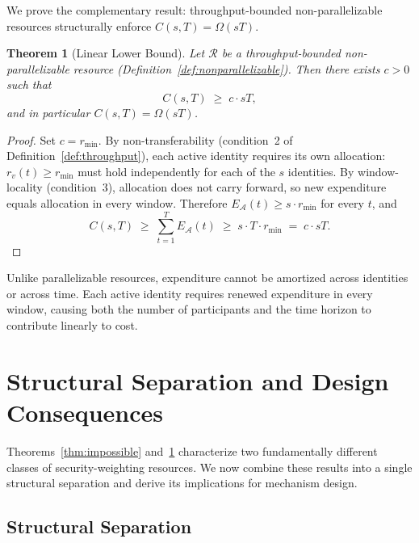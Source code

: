 \documentclass[manuscript,review]{acmart}
\newtheorem{theorem}{Theorem}[section]
\theoremstyle{remark}
\begin{document}
	We prove the complementary result: throughput-bounded
	non-parallelizable resources structurally enforce
	$C(s,T) = \Omega(sT)$.
	
	\begin{theorem}[Linear Lower Bound]
		\label{thm:linear}
		Let $\mathcal{R}$ be a throughput-bounded
		non-parallelizable resource
		(Definition~\ref{def:nonparallelizable}).
		Then there exists $c > 0$ such that
		\begin{equation}
			C(s, T) \;\geq\; c \cdot sT,
		\end{equation}
		and in particular $C(s,T) = \Omega(sT)$.
	\end{theorem}
	
	\begin{proof}
		Set $c = r_{\min}$.
		By non-transferability (condition~2 of
		Definition~\ref{def:throughput}), each active identity
		requires its own allocation: $r_v(t) \geq r_{\min}$
		must hold independently for each of the $s$ identities.
		By window-locality (condition~3), allocation does not
		carry forward, so new expenditure equals allocation
		in every window.
		Therefore $E_{\mathcal{A}}(t) \geq s \cdot r_{\min}$
		for every $t$, and
		\begin{equation}
			C(s, T) \;\geq\; \sum_{t=1}^{T} E_{\mathcal{A}}(t)
			\;\geq\; s \cdot T \cdot r_{\min}
			\;=\; c \cdot sT.
		\end{equation}
	\end{proof}
	
	Unlike parallelizable resources, expenditure cannot
	be amortized across identities or across time.
	Each active identity requires renewed expenditure
	in every window, causing both the number of
	participants and the time horizon to contribute
	linearly to cost.
	
	\section{Structural Separation and Design Consequences}
	\label{sec:separation}
	
	Theorems~\ref{thm:impossible} and~\ref{thm:linear}
	characterize two fundamentally different classes of
	security-weighting resources.
	We now combine these results into a single structural
	separation and derive its implications for mechanism
	design.
	
	\subsection{Structural Separation}
	\label{ssec:separation_theorem}
	
\end{document}
